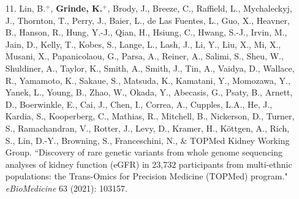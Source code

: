 \documentclass[margin]{res}
\begin{document}
\begin{resume}
\begin{itemize}
\item[11.] Lin, B.$^{+}$, \textbf{Grinde, K.}$^{+}$, Brody, J., Breeze, C., Raffield, L., Mychaleckyj, J., Thornton, T., Perry, J., Baier, L., de Las Fuentes, L., Guo, X., Heavner, B., Hanson, R.,  Hung, Y.-J., Qian, H.,  Hsiung, C., Hwang, S.-J., Irvin, M., Jain, D., Kelly, T., Kobes, S.,  Lange, L., Lash, J.,  Li, Y.,  Liu, X.,  Mi, X., Musani, X., Papanicolaou, G., Parsa, A., Reiner, A., Salimi, S., Sheu, W., Shuldiner, A., Taylor, K., Smith, A., Smith, J., Tin, A., Vaidya, D., Wallace, R., Yamamoto, K., Sakaue, S., Matsuda, K.,  Kamatani, Y.,  Momozawa, Y., Yanek, L., Young, B.,  Zhao, W.,  Okada, Y.,  Abecasis, G., Psaty, B.,  Arnett, D.,  Boerwinkle, E.,  Cai, J., Chen, I., Correa, A., Cupples, L.A.,  He, J., Kardia, S.,  Kooperberg, C., Mathias, R., Mitchell, B., Nickerson, D., Turner, S., Ramachandran, V., Rotter, J., Levy, D.,  Kramer, H.,  Köttgen, A., Rich, S., Lin, D.-Y., Browning, S., Franceschini, N., \& TOPMed Kidney Working Group. ``Discovery of rare genetic variants from whole genome sequencing analyses  of kidney function (eGFR) in 23,732 participants from multi-ethnic populations: the Trans-Omics for Precision Medicine (TOPMed) program." \textit{eBioMedicine} 63 (2021): 103157.


\end{itemize}
\end{resume}
\end{document}
